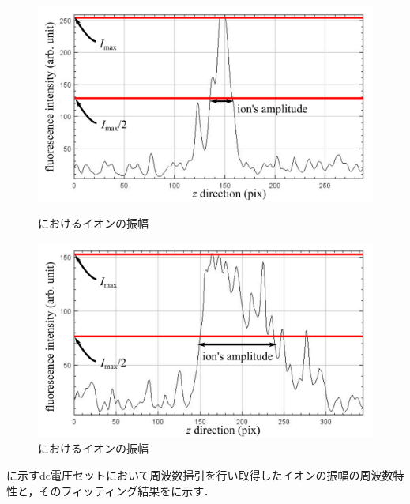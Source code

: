 \begin{figure}[h]
	\begin{minipage}{0.5\linewidth}
		\begin{center}
			\includegraphics[width = 0.98\columnwidth]{./methods/figure/PlotOf_off_resonance.png}
			\caption{におけるイオンの振幅}
			\label{fig:example_off_resonance_Amp}
		\end{center}
	\end{minipage}
	\begin{minipage}{0.5\linewidth}
		\begin{center}
			\includegraphics[width = 0.98\columnwidth]{./methods/figure/PlotOf_resonance.png}
			\caption{におけるイオンの振幅}
			\label{fig:example_resonance_Amp}
		\end{center}
	\end{minipage}
\end{figure}

に示すdc電圧セットにおいて周波数掃引を行い取得したイオンの振幅の周波数特性と，そのフィッティング結果をに示す．

